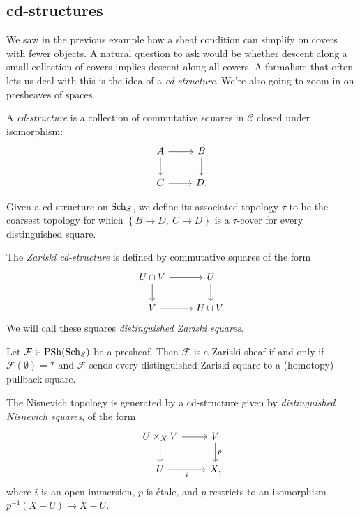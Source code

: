 \documentclass[11pt,openany]{book}
\renewcommand{\Pre}{\mathrm{PSh}}
\begin{document}
\subsection{cd-structures} We saw in the previous example how a sheaf condition can simplify on covers with fewer objects. A natural question to ask would be whether descent along a small collection of covers implies descent along all covers. A formalism that often lets us deal with this is the idea of a \textit{cd-structure}. We're also going to zoom in on presheaves of spaces.

\begin{definition} A \textit{cd-structure} is a collection of commutative squares in $\mathscr{C}$ closed under isomorphism:
\[ \begin{tikzcd}
    A\rar\dar & B\dar\\
    C\rar & D.
\end{tikzcd} \]
\end{definition}

\begin{terminology} Given a cd-structure on $\mathrm{Sch}_S$, we define its associated topology $\tau$ to be the coarsest topology for which $\left\{ B\to D,\ C\to D \right\}$ is a $\tau$-cover for every distinguished square.
\end{terminology}



\begin{example} The \textit{Zariski cd-structure} is defined by commutative squares of the form
\[\begin{tikzcd}
    U\cap V\rar\dar & U\dar\\
    V\rar & U\cup V.
\end{tikzcd} \]
We will call these squares \textit{distinguished Zariski squares}.
\end{example}


\begin{theorem} Let $\mathcal{F} \in \Pre(\Sch_S)$ be a presheaf. Then $\mathcal{F}$ is a Zariski sheaf if and only if $\mathcal{F}(\emptyset) = \ast$ and $\mathcal{F}$ sends every distinguished Zariski square to a (homotopy) pullback square.
\end{theorem}






\begin{example} The Nisnevich topology is generated by a cd-structure given by \textit{distinguished Nisnevich squares}, of the form
\[ \begin{tikzcd}
    U \times_X V\rar\dar & V\dar["p" right]\\
    U\rar["i" below] & X,
\end{tikzcd} \]
where $i$ is an open immersion, $p$ is \'etale, and $p$ restricts to an isomorphism $p^{-1}(X-U)\to X-U$.
\end{example}
\end{document}
